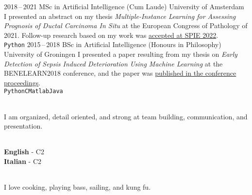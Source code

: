 \documentclass[9pt]{developercv}
\begin{document}
\begin{entrylist}
\entry
    {2018\,--\,2021}
    {MSc in Artificial Intelligence (Cum Laude)}
    {University of Amsterdam}
    {I presented an abstract on my thesis \emph{Multiple-Instance Learning for Assessing Prognosis of Ductal Carcinoma In Situ} at the European Congress of Pathology of 2021. Follow-up research based on my work was \href{https://doi.org/10.1117/12.2612838}{accepted at SPIE 2022}.\\
    \texttt{Python}}
\entry
    {2015\,--\,2018}
    {BSc in Artificial Intelligence (Honours in Philosophy)}
    {University of Groningen}
    {I presented a paper resulting from my thesis on \emph{Early Detection of Sepsis Induced Deterioration Using Machine Learning} at the BENELEARN2018 conference, and the paper was \href{https://doi.org/10.1007/978-3-030-31978-6_1}{published in the conference proceedings}.\\
    \texttt{Python}\slashsepb\texttt{C}\slashsepb\texttt{Matlab}\slashsepb\texttt{Java}}
\end{entrylist}


\begin{minipage}[t]{0.45\textwidth}
    \vspace{-\baselineskip}
    \\
    I am organized, detail oriented, and strong at team building, communication, and presentation.
\end{minipage}
\hfill
\begin{minipage}[t]{0.225\textwidth}
    \vspace{-\baselineskip}
    \\
    \textbf{English} - C2\\
    \textbf{Italian} - C2
\end{minipage}
\hfill
\begin{minipage}[t]{0.225\textwidth}
    \vspace{-\baselineskip}
    \\
    I love cooking, playing bass, sailing, and kung fu.
\end{minipage}
\end{document}
